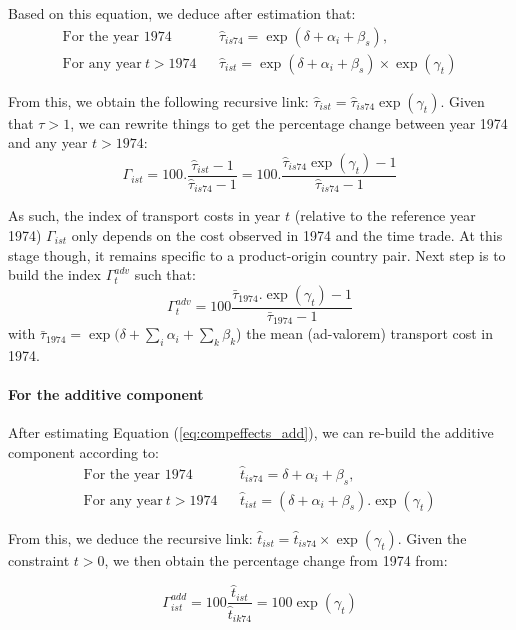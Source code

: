 \documentclass[a4paper,11pt]{article}
\begin{document}
Based on this equation, we deduce after estimation that:
\begin{eqnarray*}
\text{For the year 1974}&& \widehat{\tau}_{is74} = \exp(\delta +\alpha_i+\beta_s), \\
\text{For any year}~t> 1974&& \widehat{\tau}_{ist} = \exp(\delta +\alpha_i+\beta_s)\times \exp(\gamma_t)
\end{eqnarray*}

From this, we obtain the following recursive link: $\widehat{\tau}_{ist} = \widehat{\tau}_{is74}\exp(\gamma_t)$. Given that $\tau >1$, we can rewrite things to get the percentage change between year 1974 and any year $t>1974$:
$$\Gamma_{ist} = 100.\frac{\widehat{\tau}_{ist}-1}{\widehat{\tau}_{is74}-1} = 100.\frac{\widehat{\tau}_{is74}\exp(\gamma_t)-1}{\widehat{\tau}_{is74}-1}$$

As such, the index of transport costs in year $t$ (relative to the reference year 1974) $\Gamma_{ist} $  only depends on the cost observed in 1974 and the time trade. At this stage though, it remains specific to a product-origin country pair. Next step is to build the index $\Gamma^{adv}_t$ such that:
\begin{equation}
 \Gamma^{adv}_t= 100\frac {\bar{\tau}_{1974}.\exp(\gamma_t)-1} {\bar{\tau}_{1974}-1}  \label{eq:tcadv_compoeffect}
\end{equation}
\noindent with $\bar{\tau}_{1974} = \exp(\delta + \sum_i \alpha_i + \sum_k \beta_k$) the mean (ad-valorem) transport cost in 1974.

\paragraph{For the additive component} After estimating Equation (\ref{eq:compeffects_add}), we can re-build the additive component according to:
\begin{eqnarray*}
\text{For the year 1974}&&\widehat{t}_{is74}=  \delta + \alpha_i+ \beta_s, \\
\text{For any year}~t> 1974&&\widehat{t}_{ist}=\left(\delta + \alpha_i+ \beta_s\right).\exp(\gamma_t)
\end{eqnarray*}

From this, we deduce the recursive link: $\widehat{t}_{ist} = \widehat{t}_{is74} \times \exp(\gamma_t)$. Given the constraint $t>0$, we then obtain the percentage change from 1974 from:

\begin{equation*}
\Gamma^{add}_{ist} = 100\frac{\widehat{t}_{ist}}{\widehat{t}_{ik74}} = 100\exp(\gamma_t)
\end{equation*}
\end{document}
